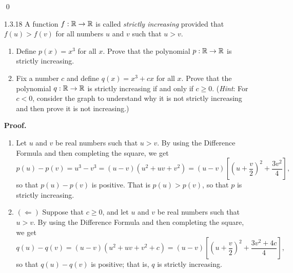 \begin{enumerate}
\begin{enumerate}
      \end{enumerate} \qed
   \item[1.3.18]  A function $f: \mathbb{R} \rightarrow \mathbb{R}$ is called
                  \textit{strictly increasing} provided that $f(u) > f(v)$ for
                  all numbers $u$ and $v$ such that $u > v$.
                  \begin{enumerate}
                     \item Define $p(x) = x^3$ for all $x$. Prove that the
                           polynomial $p : \mathbb{R} \rightarrow \mathbb{R}$ is strictly
                           increasing.
                     \item Fix a number $c$ and define $q(x) = x^3 + cx$ for all
                           $x$. Prove that the polynomial
                           $q : \mathbb{R} \rightarrow \mathbb{R}$ is strictly increasing if and
                           only if $c \ge 0$. (\textit{Hint}: For $c < 0$,
                           consider the graph to understand why it is not
                           strictly increasing and then prove it is not
                           increasing.)
                  \end{enumerate}

      \textbf{Proof.}

      \begin{enumerate}
         \item Let $u$ and $v$ be real numbers such that $u > v$. By using the
               Difference Formula and then completing the square, we get
               $$p(u) - p(v) = u^3 - v^3 = (u - v)(u^2 + uv + v^2) =
                 (u - v)\left[\left(u + \frac{v}{2}\right)^2 +
                 \frac{3v^2}{4}\right],$$
               so that $p(u) - p(v)$ is positive. That is $p(u) > p(v)$, so that
               $p$ is strictly increasing.
         \item $(\Leftarrow)$ Suppose that $c \ge 0$, and let $u$ and $v$ be
               real numbers such that $u > v$.  By using the Difference Formula 
               and then completing the square, we get
               $$q(u) - q(v) = (u - v)(u^2 + uv + v^2 + c) =
                 (u - v)\left[\left(u + \frac{v}{2}\right)^2 +
                 \frac{3v^2 + 4c}{4}\right],$$
               so that $q(u) - q(v)$ is positive; that is, $q$ is strictly
               increasing.


\end{enumerate}
\end{enumerate}
